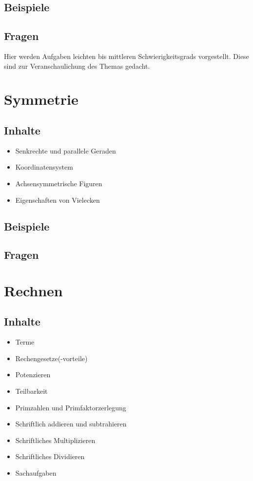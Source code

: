 \documentclass{article}
\begin{document}
\subsection{Beispiele}
\subsection{Fragen}
Hier werden Aufgaben leichten bis mittleren Schwierigkeitsgrads vorgestellt. Diese sind zur Veranschaulichung  des Themas gedacht. 
\newpage
\section{Symmetrie}
\subsection{Inhalte}
\begin{itemize}
    \item Senkrechte und parallele Geraden
    \item Koordinatensystem
    \item Achsensymmetrische Figuren
    \item Eigenschaften von Vielecken
\end{itemize}
\subsection{Beispiele}
\subsection{Fragen}
\newpage
\section{Rechnen}
\subsection{Inhalte}
\begin{itemize}
    \item Terme
    \item Rechengesetze(-vorteile)
    \item Potenzieren
    \item Teilbarkeit
    \item Primzahlen und Primfaktorzerlegung
    \item Schriftlich addieren und subtrahieren
    \item Schriftliches Multiplizieren
    \item Schriftliches Dividieren
    \item Sachaufgaben
\end{itemize}
\end{document}
